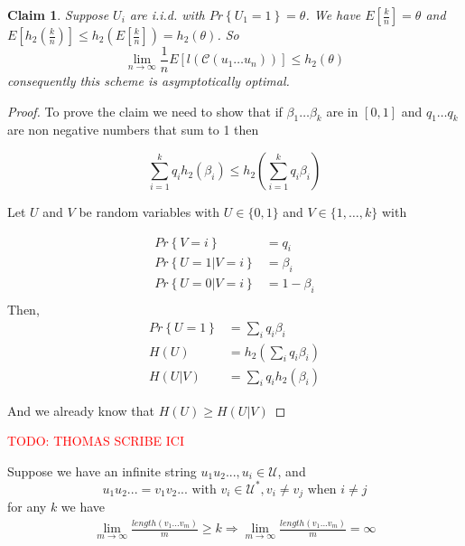 \documentclass{article}
\newtheorem{claim}{Claim}[section]
\theoremstyle{definition} %
\newcommand{\todo}[1]{\textcolor{red}{TODO: #1}}
\renewcommand{\Pr}[1]{Pr\left\{#1\right\}}
\newcommand{\Ex}[1]{E\left[#1\right]}
\newcommand{\pfrac}[2]{\left( \frac{#1}{#2} \right)}
\def\U{\mathcal{U}}
\def\C{\mathscr{C}}
\begin{document}
\begin{claim}
Suppose $U_i$ are i.i.d. with $\Pr{U_1=1}=\theta$. We have $\Ex{ \frac k n} = \theta$ and $\Ex{h_2 \pfrac k n } \leq h_2(\Ex{\frac k n}) = h_2(\theta)$. So
\[
  \lim_{n\to \infty} \frac 1 n \Ex{l(\C(u_1\dots u_n))} \leq h_2(\theta)
\]
consequently this scheme is asymptotically optimal.
\end{claim}

\begin{proof}
  To prove the claim we need to show that if $\beta_1\dots \beta_k$ are in $[0,1]$ and $q_1 \dots q_k$ are non negative numbers that sum to 1 then

  \[
    \sum_{i=1}^k q_i h_2(\beta_i) \leq h_2 \left(\sum_{i=1}^k q_i \beta_i \right)
  \]

  Let $U$ and $V$ be random variables with $U \in \{0,1\}$ and $V \in \{1,\dots,k\}$ with

  \begin{align*}
    \Pr{V=i} &= q_i\\
    \Pr{U=1|V=i} &= \beta_i\\
    \Pr{U=0|V=i} &= 1- \beta_i\\
  \end{align*}
  Then,
  \begin{align*}
    \Pr{U=1} &= \sum_i q_i \beta_i\\
    H(U) &= h_2\left(\sum_i q_i \beta_i \right)\\
    H(U|V) &= \sum_i q_i h_2(\beta_i)
  \end{align*}

  And we already know that $H(U) \geq H(U|V)$
\end{proof}













\todo{THOMAS SCRIBE ICI}


Suppose we have an infinite string $u_1 u_2 ..., u_i \in \U$, and
$$u_1 u_2 ... = v_1 v_2 ... \text{ with } v_i \in \U^*, v_i \neq v_j \text{ when } i \neq j$$
for any $k$ we have
\begin{align*}
  \lim_{m \to \infty} \frac{length(v_1...v_m)}{m} \geq k
  \Rightarrow \lim_{m \to \infty} \frac{length(v_1 ... v_m)}{m} =
  \infty
\end{align*}
\end{document}
